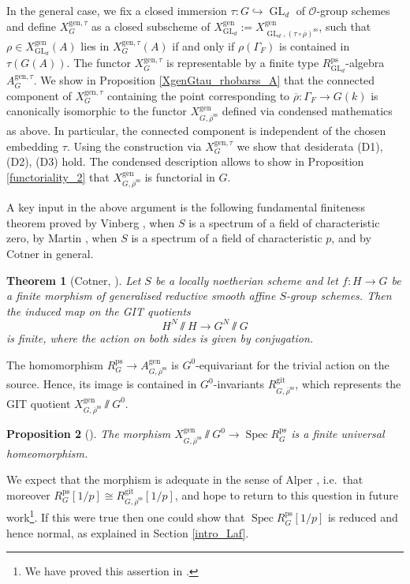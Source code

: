 \documentclass{amsart}
\newtheorem{prop}{Proposition}[section]
\newtheorem{thm}[prop]{Theorem}
\theoremstyle{definition}
\theoremstyle{remark}
\DeclareMathOperator{\GL}{GL}
\DeclareMathOperator{\Spec}{Spec}
\newcommand{\OO}{\mathcal O}
\newcommand{\rhobar}{\overline{\rho}}
\newcommand{\ps}{\mathrm{ps}}
\newcommand{\gen}{\mathrm{gen}}
\newcommand{\rhobarss}{\rhobar^{\mathrm{ss}}}
\newcommand{\git}{\mathrm{git}}
\begin{document}
In the general case, we fix a closed immersion $\tau: G \hookrightarrow \GL_d$ 
of $\OO$-group schemes and define $X^{\gen, \tau}_G$ as a closed 
subscheme of $X^{\gen}_{\GL_d}:=X^{\gen}_{\GL_d, (\tau\circ \rhobar)^{\mathrm{ss}}}$, such 
that $\rho\in X^{\gen}_{\GL_d}(A)$ lies in $X^{\gen, \tau}_G(A)$ if and only if 
$\rho(\Gamma_F)$ is contained in $\tau(G(A))$. The functor 
$X^{\gen, \tau}_G$ is representable by a finite type $R^{\ps}_{\GL_d}$-algebra 
$A^{\gen, \tau}_G$. We show in Proposition \ref{XgenGtau_rhobarss_A} 
that the connected component of $X^{\gen,\tau}_G$ containing the point 
corresponding to $\rhobar:\Gamma_F \rightarrow G(k)$ is canonically
isomorphic to the functor $X^{\gen}_{G, \rhobarss}$ defined 
via condensed mathematics as above. In particular, the connected 
component is independent of the chosen embedding $\tau$. Using 
the construction via $X^{\gen, \tau}_G$ we show 
that desiderata (D1), (D2), (D3) hold. The condensed description allows 
to show in Proposition \ref{functoriality_2} that 
$X^{\gen}_{G, \rhobarss}$ is functorial in $G$. 


A key input in the above argument is the following 
fundamental finiteness theorem proved by Vinberg \cite{vinberg}, when $S$ is a spectrum of a field of characteristic zero, 
by Martin \cite{martin}, when $S$ is a spectrum of a field of characteristic $p$, and by Cotner \cite{cotner}
in general.


\begin{thm}[Cotner, \cite{cotner}]\label{intro_cotner_main} Let $S$ be a locally noetherian scheme and let $f: H\rightarrow G$ be a finite morphism 
of generalised reductive smooth affine $S$-group schemes. Then the induced map 
on the GIT quotients
$$ H^N\sslash H \rightarrow G^N \sslash G$$
is finite, where the action on both sides is given by conjugation. 
\end{thm}

The homomorphism $R^{\ps}_G \rightarrow A^{\gen}_{G, \rhobarss}$ is $G^0$-equivariant for the trivial action on the source. Hence, its image 
is contained in $G^0$-invariants $R^{\git}_{G, \rhobarss}$, which represents the GIT quotient $X^{\gen}_{G, \rhobarss}\sslash G^0$. 

\begin{prop}[]\label{zwischen-stop} The morphism %
$X^{\gen}_{G, \rhobarss}\sslash G^0\rightarrow \Spec R^{\ps}_G$
is a finite universal homeomorphism. 
\end{prop}
We expect that the morphism is  adequate in the sense of Alper \cite{alper}, i.e.~that moreover $R^{\ps}_G[1/p] \cong R^{\git}_{G, \rhobarss}[1/p]$, 
and hope to return to this question in future work\footnote{We have proved this assertion in \cite{inf_laf}.}. If this were true then 
one could show that $\Spec R^{\ps}_G[1/p]$ is reduced and hence normal, as explained in Section \ref{intro_Laf}.
\end{document}
